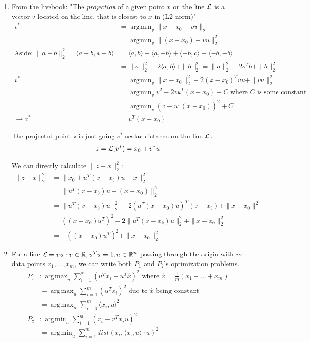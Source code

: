 \documentclass[11pt]{article}
\DeclareMathOperator*{\argmax}{arg\!max}
\DeclareMathOperator*{\argmin}{arg\!min}
\begin{document}
\begin{solution}
\begin{enumerate}
    \item From the livebook: "The \emph{projection} of a given point $x$ on the line ${\cal L}$ is a vector $v$ located on the line, that is closest to $x$ in (L2 norm)"
    \begin{align*}
        v^* &= \argmin_{v} \|x - x_0 - vu\|_2 \\
        &= \argmin_{v} \|(x - x_0) - vu\|_2^2 \\
        \text{Aside: } \|a-b\|_2^2 = \langle a-b,a-b \rangle &= \langle a,b \rangle + \langle a,-b \rangle + \langle -b,a \rangle + \langle -b,-b \rangle \\
        &= \|a\|_2^2 - 2 \langle a,b \rangle + \|b\|_2^2 = \|a\|_2^2 - 2a^Tb + \|b\|_2^2 \\
        v^* &= \argmin_v \|x-x_0\|_2^2 - 2(x-x_0)^T vu + \|vu\|_2^2 \\
        &= \argmin_v v^2 - 2vu^T (x-x_0) + C \text{ where } C \text{ is some constant } \\
        &= \argmin_v (v - u^T(x-x_0))^2 + C\\
        \rightarrow v^* &= u^T(x-x_0)
    \end{align*}

    The projected point $z$ is just going $v^*$ scalar distance on the line $\cal L$.
    \begin{align*}
        z = {\cal L} (v^*) = x_0 + v^* u
    \end{align*}

    We can directly calculate $\|z-x\|_2^2$:
    \begin{align*}
        \|z - x\|_2^2 &= \|x_0 + u^T(x-x_0)u -x\|^2_2 \\
        &= \|u^T(x-x_0)u - (x-x_0)\|_2^2 \\
        &= \|u^T(x-x_0)u\|_2^2 - 2(u^T(x-x_0)u)^T(x-x_0) + \|x-x_0\|^2 \\
        &= ((x-x_0)u^T)^2 - 2\|u^T(x-x_0)u\|^2_2 + \|x-x_0\|_2^2 \\
        &= -((x-x_0)u^T)^2 + \|x-x_0\|_2^2
    \end{align*}

\item For a line ${\cal L} = vu : v \in \mathbb{R}, u^Tu = 1, u \in \mathbb{R}^n$ passing through the origin with $m$ data points $x_1, \dots, x_m$, we can write both $P_1$ and $P_2$'s optimization problems.
    \begin{align*}
        P_1&: \argmax_u \sum_{i=1}^m (u^T x_i - u^T \hat{x})^2 \text{ where } \hat{x} = \frac{1}{m} (x_1 + \dots + x_m) \\
        &= \argmax_u \sum_{i=1}^m (u^T x_i)^2 \text{ due to } \hat{x} \text{ being constant} \\
        &= \argmax_u \sum_{i=1}^m \langle x_i, u \rangle^2 \\
        P_2&: \argmin_u \sum_{i=1}^m (x_i - u^T x_i u)^2 \\
        &= \argmin_u \sum_{i=1}^m dist(x_i, \langle x_i,u \rangle \cdot u)^2
    \end{align*}


\end{enumerate}
\end{solution}
\end{document}
